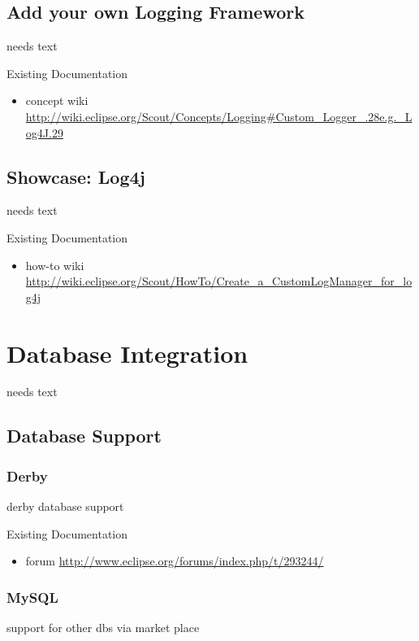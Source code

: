 \documentclass[a4paper,10pt,twoside]{book}
\begin{document}
\section{Add your own Logging Framework}
needs text

\noindent Existing Documentation
\begin{itemize}
  \item concept wiki \url{http://wiki.eclipse.org/Scout/Concepts/Logging#Custom_Logger_.28e.g._Log4J.29}
\end{itemize}

\section{Showcase: Log4j}
needs text

\noindent Existing Documentation
\begin{itemize}
  \item how-to wiki \url{http://wiki.eclipse.org/Scout/HowTo/Create_a_CustomLogManager_for_log4j}
\end{itemize}

\chapter{Database Integration}
needs text

\section{Database Support}

\subsection{Derby}
derby database support

\noindent Existing Documentation
\begin{itemize}
  \item forum \url{http://www.eclipse.org/forums/index.php/t/293244/}
\end{itemize}

\subsection{MySQL}
support for other dbs via market place
\end{document}
